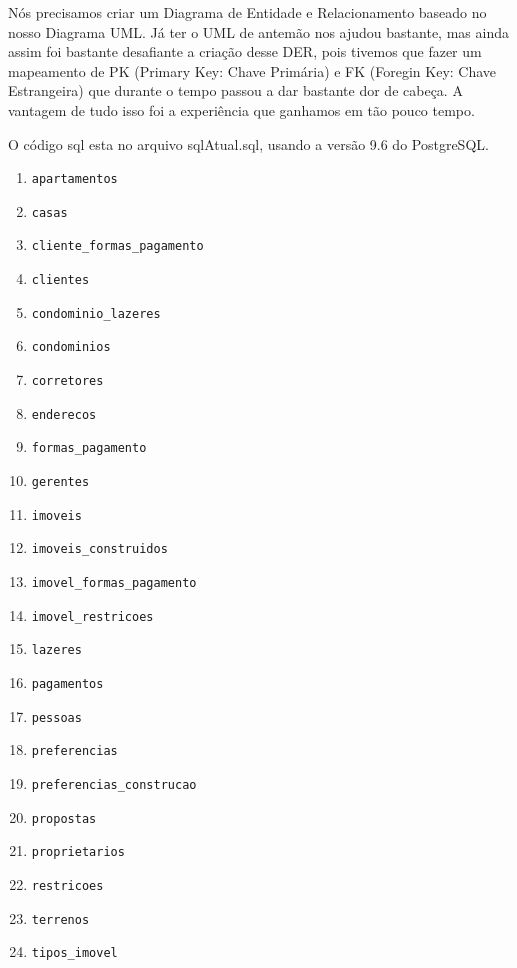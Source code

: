 \documentclass[a4paper,11pt,fleqn]{article}
\begin{document}
 Nós precisamos criar um Diagrama de Entidade e Relacionamento baseado no nosso Diagrama UML. Já ter o UML de antemão nos ajudou bastante, mas ainda assim foi
bastante desafiante a criação desse DER, pois tivemos que fazer um mapeamento de PK (Primary Key: Chave Primária) e FK (Foregin Key: Chave Estrangeira) que durante
o tempo passou a dar bastante dor de cabeça. A vantagem de tudo isso foi a experiência que ganhamos em tão pouco tempo.

 O código sql esta no arquivo sqlAtual.sql, usando a versão 9.6 do PostgreSQL.

\begin{enumerate}
    \item\texttt{apartamentos}
    \item\texttt{casas}
    \item\texttt{cliente\_formas\_pagamento}
    \item\texttt{clientes}
    \item\texttt{condominio\_lazeres}
    \item\texttt{condominios}
    \item\texttt{corretores}
    \item\texttt{enderecos}
    \item\texttt{formas\_pagamento}
    \item\texttt{gerentes}
    \item\texttt{imoveis}
    \item\texttt{imoveis\_construidos}
    \item\texttt{imovel\_formas\_pagamento}
    \item\texttt{imovel\_restricoes}
    \item\texttt{lazeres}
    \item\texttt{pagamentos}
    \item\texttt{pessoas}
    \item\texttt{preferencias}
    \item\texttt{preferencias\_construcao}
    \item\texttt{propostas}
    \item\texttt{proprietarios}
    \item\texttt{restricoes}
    \item\texttt{terrenos}
    \item\texttt{tipos\_imovel}
\end{enumerate}
\end{document}
